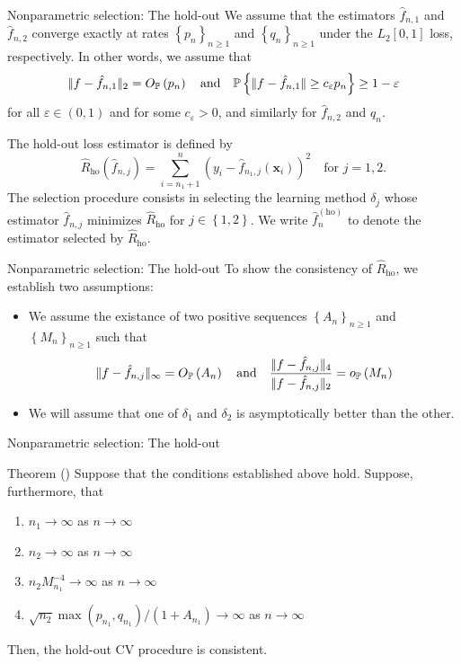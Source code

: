 \documentclass{beamer}
\newcommand{\0}{\emptyset}
\newcommand{\prob}{\mathbb{P}}
\newcommand{\paren}[1]{\left(#1 \right)}
\newcommand{\set}[1]{\left\{ #1 \right\}}
\newcommand{\norm}[1]{|\hspace{-1pt}|#1 |\hspace{-1pt}|}
\newcommand{\x}{\boldsymbol{x}}
\newcommand{\ho}{\hat{R}_{\mathrm{ho}}}
\newcommand{\op}[1]{o_{\prob}\paren{#1}}
\newcommand{\Op}[1]{O_{\prob}\paren{#1}}
\newcommand{\fhat}[2]{\hat{f}_{#1, #2}}
\newcommand{\fho}{\hat{f}^{(\mathrm{ho})}_{n}}
\newcommand{\1}{\mathmybb{1}}
\begin{document}
\begin{frame}{Nonparametric selection: The hold-out}
  We assume that the estimators \(\fhat{n}{1}\) and \(\fhat{n}{2}\) converge exactly at rates \(\set{p_{n}}_{n\geq 1}\) and \(\set{q_{n}}_{n\geq 1}\) under the \(L_{2}[0,1]\) loss, respectively. In other words, we assume that
  \[\norm{f - \fhat{n}{1}}_{2} = \Op{p_{n}} \quad\text{and}\quad \prob\set{\norm{f-\fhat{n}{1}} \geq c_{\varepsilon}p_{n}} \geq 1-\varepsilon\]
  for all \(\varepsilon\in(0,1)\) and for some \(c_{\varepsilon}>0\), and similarly for \(\fhat{n}{2}\) and \(q_{n}\).

  The \alert{hold-out} loss estimator is defined by
  \begin{equation}\label{def:holoss}
      \ho(\fhat{n}{j}) = \sum_{i=n_{1}+1}^{n}\paren{y_{i} - \fhat{n_{1}}{j}(\x_{i})}^{2}\quad\text{for }j=1,2.
  \end{equation}
  The selection procedure consists in selecting the learning method \(\delta_{j}\) whose estimator \(\fhat{n}{j}\) minimizes \(\ho\) for \(j\in\set{1,2}\). We write \(\fho\) to denote the estimator selected by \(\ho\).
\end{frame}

\begin{frame}{Nonparametric selection: The hold-out}
  To show the consistency of \(\ho\), we establish two assumptions:  
  \begin{itemize}
    \item We assume the existance of two positive sequences \(\set{A_{n}}_{n\geq1}\) and \(\set{M_{n}}_{n\geq1}\) such that 
    \begin{equation}\label{eq:lpconditions}
      \norm{f-\fhat{n}{j}}_{\infty} = \Op{A_{n}}\quad\text{and}\quad\frac{\norm{f-\fhat{n}{j}}_{4}}{\norm{f-\fhat{n}{j}}_{2}} = \op{M_{n}}
    \end{equation}
    \item We will assume that one of \(\delta_{1}\) and \(\delta_{2}\) is asymptotically better than the other.
    
  \end{itemize}
\end{frame}

\begin{frame}{Nonparametric selection: The hold-out}
\begin{block}{Theorem (\cite{yang_2007})}
    Suppose that the conditions established above hold. Suppose, furthermore, that
    \begin{enumerate}
        \item \(n_{1}\to\infty\) as \(n\to\infty\)
        \item \(n_{2}\to\infty\) as \(n\to\infty\)
        \item \(n_{2}M_{n_{1}}^{-4} \to \infty\) as \(n\to\infty\)
        \item \(\sqrt{n_{2}}\max(p_{n_{1}}, q_{n_{1}})/\paren{1+A_{n_{1}}}\to\infty \) as \(n\to\infty\)
    \end{enumerate}
    Then, the hold-out CV procedure is consistent.
\end{block}
\end{frame}
\end{document}
